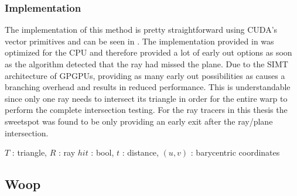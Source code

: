\subsubsection{Implementation}

The implementation of this method is pretty straightforward using
CUDA's vector primitives and can be seen in
. The implementation provided in
 was optimized for the CPU and therefore
provided a lot of early out options as soon as the algorithm detected
that the ray had missed the plane. Due to the SIMT architecture of
GPGPUs, providing as many early out possibilities as
 causes a branching overhead and results in
reduced performance. This is understandable since only one ray needs
to intersect its triangle in order for the entire warp to perform the
complete intersection testing. For the ray tracers in this thesis the
sweetspot was found to be only providing an early exit after the
ray/plane intersection.

\begin{algorithm}
  \caption{Möller-Trumbore ray/triangle intersection test}
  \label{alg:moellerTrumbore}
  \begin{algorithmic}
              {$T$ : triangle, $R$ : ray}
              {$hit$ : bool, $t$ : distance, $(u,v)$ : barycentric coordinates}
              {
                \ELSE
                \ENDIF
              }
  \end{algorithmic}
\end{algorithm}

\subsection{Woop}

